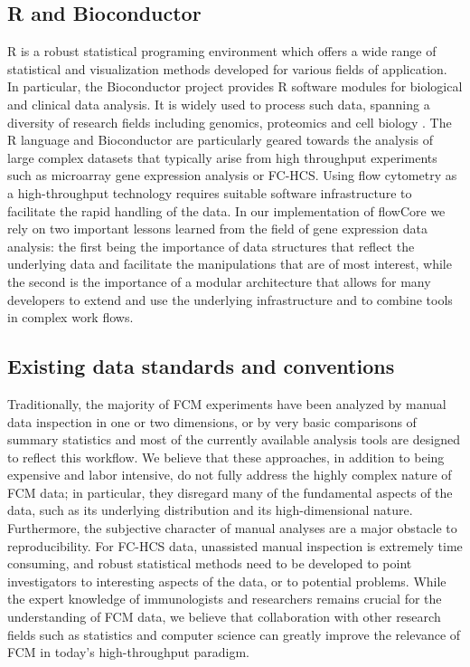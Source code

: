 \documentclass[12pt]{article}
\newcommand{\Rpackage}[1]{{\textsf{#1}}}
\begin{document}
\subsection*{R and Bioconductor}
R is a robust statistical programing environment which offers a wide
range of statistical and visualization methods developed for various
fields of application. In particular, the Bioconductor project
provides R software modules for biological and clinical data analysis.
It is widely used to process such data, spanning a diversity of
research fields including genomics, proteomics and cell biology
\citep{BIOC}. The R language and Bioconductor are
particularly geared towards the analysis of large complex datasets
that typically arise from high throughput experiments such as
microarray gene expression analysis or FC-HCS. Using flow cytometry as
a high-throughput technology requires suitable software infrastructure
to facilitate the rapid handling of the data. In our implementation of
\Rpackage{flowCore} we rely on two important lessons learned from the field of
gene expression data analysis: the first being the importance of data
structures that reflect the underlying data and facilitate the
manipulations that are of most interest, while the second is the
importance of a modular architecture that allows for many developers
to extend and use the underlying infrastructure and to combine tools
in complex work flows.

\subsection*{Existing data standards and conventions}
Traditionally, the majority of FCM experiments have been analyzed by
manual data inspection in one or two dimensions, or by very basic
comparisons of summary statistics and most of the currently available
analysis tools are designed to reflect this workflow.  We believe that
these approaches, in addition to being expensive and labor intensive,
do not fully address the highly complex nature of FCM data; in
particular, they disregard many of the fundamental aspects of the
data, such as its underlying distribution and its high-dimensional
nature. Furthermore, the subjective character of manual analyses are a
major obstacle to reproducibility. For FC-HCS data, unassisted manual
inspection is extremely time consuming, and robust statistical methods
need to be developed to point investigators to interesting aspects of
the data, or to potential problems. While the expert knowledge of
immunologists and researchers remains crucial for the understanding of
FCM data, we believe that collaboration with other research fields
such as statistics and computer science can greatly improve the
relevance of FCM in today's high-throughput paradigm.
\end{document}
